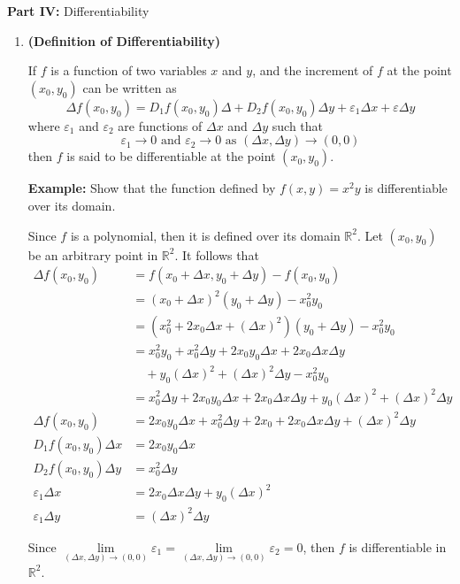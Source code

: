 \documentclass{article}
\begin{document}
\noindent \textbf{Part IV: } Differentiability 
\begin{enumerate}[start=1,label={\bfseries Theorem \arabic*:}, wide = 0pt]
\vspace{-0.5em}
\item{\textbf{(Definition of Differentiability)}}

If $f$ is a function of two variables $x$ and $y$, and the increment of $f$ at the point $(x_0,y_0)$ can be written as 
\[\Delta f(x_0,y_0) =D_1f(x_0,y_0)\Delta +D_2f(x_0,y_0)\Delta y +\varepsilon_1 \Delta x+\varepsilon \Delta y\]
where $\varepsilon_1$ and $\varepsilon_2$ are functions  of $\Delta x$ and $\Delta y$ such that 
\[\varepsilon_1 \rightarrow{0} \text{ and } \varepsilon_2 \rightarrow{0} \text{ as } (\Delta x, \Delta y) \rightarrow{(0,0)}\]
then $f$ is said to be differentiable at the point $(x_0,y_0)$.

\textbf{Example: } Show that the function defined by $f(x,y)=x^2y$ is differentiable over its domain.

Since $f$ is a polynomial, then it is defined over its domain $\mathbb{R}^2$. Let $(x_0,y_0)$ be an arbitrary point in $\mathbb{R}^2$. It follows that
\begin{align*}
    \Delta f(x_0, y_0) &= f(x_0 + \Delta x, y_0 + \Delta y) - f(x_0, y_0) \\
    &= (x_0 + \Delta x)^2 (y_0 + \Delta y) - x_0^2 y_0 \\
    &= (x_0^2 + 2x_0 \Delta x + (\Delta x)^2)(y_0 + \Delta y) - x_0^2 y_0 \\
    &= x_0^2 y_0 + x_0^2 \Delta y + 2x_0 y_0 \Delta x + 2x_0 \Delta x \Delta y \\
    &\quad + y_0 (\Delta x)^2 + (\Delta x)^2 \Delta y - x_0^2 y_0 \\
    &= x_0^2 \Delta y + 2x_0 y_0 \Delta x + 2x_0 \Delta x \Delta y + y_0 (\Delta x)^2 + (\Delta x)^2 \Delta y \\
   \Delta f(x_0,y_0) &= 2x_0y_0\Delta x + x_0^2 \Delta y + 2x_0 + 2x_0\Delta x \Delta y + (\Delta x)^2 \Delta y \\[1.5ex]
    D_1 f(x_0, y_0) \Delta x &= 2x_0 y_0 \Delta x \\
    D_2 f(x_0, y_0) \Delta y &= x_0^2 \Delta y \\
    \varepsilon_1 \Delta x &= 2x_0 \Delta x \Delta y + y_0 (\Delta x)^2 \\
    \varepsilon_1 \Delta y &= (\Delta x)^2 \Delta y
\end{align*}

Since $\lim \limits_{(\Delta x, \Delta y) \rightarrow{(0,0)}} \varepsilon_1 = \lim \limits_{(\Delta x, \Delta y) \rightarrow{(0,0)}} \varepsilon_2=0$, then $f$ is differentiable in $\mathbb{R}^2$.


\end{enumerate}
\end{document}
